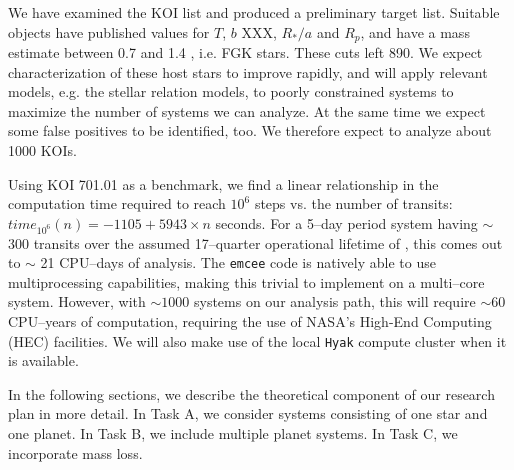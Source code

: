\medskip
{\centerline{}}
\smallskip

We have examined the KOI list and produced a preliminary target list. Suitable objects have published values for $T$, $b$ XXX, $R_*/a$ and $R_p$, and have a mass estimate between 0.7 and 1.4 \msun, i.e. FGK stars. These cuts left
890.  We expect characterization of these host stars to improve rapidly, and will apply relevant models, e.g. the \cite{Torres10} stellar relation models, to poorly constrained systems to maximize the number of systems we can analyze. At the same time we expect some false positives to be identified, too. We therefore expect to analyze about 1000 KOIs.

\medskip
{\centerline{}}
\smallskip


Using KOI 701.01 as a benchmark, we find a linear relationship in the
computation time required to reach $10^6$ steps vs. the number of
transits: $time_{10^6}(n) = -1105 + 5943 \times n$ seconds.
%
For a 5--day period system having $\sim$ 300 transits over the assumed
17--quarter operational lifetime of \kepler, this comes out to $\sim$
21 CPU--days of analysis.  The {\tt emcee} code is natively able to
use multiprocessing capabilities, making this trivial to implement on
a multi--core system.  However, with $\sim 1000$ systems on our
analysis path, this will require $\sim 60$ CPU--years of computation,
requiring the use of NASA's High-End Computing (HEC) facilities.  We
will also make use of the local {\tt Hyak} compute cluster when it is
available.

\medskip
{\centerline{}}
\smallskip

In the following sections, we describe the theoretical component of
our research plan in more detail.  In Task A, we consider systems
consisting of one star and one planet.  In Task B, we include multiple
planet systems. In Task C, we incorporate mass loss.

